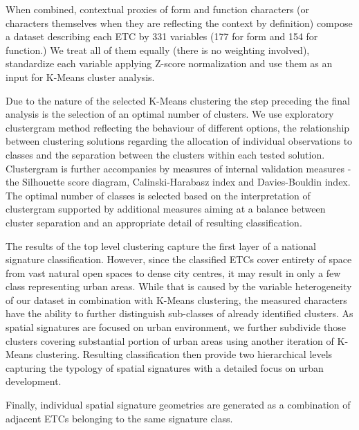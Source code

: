 

When combined, contextual proxies of form and function characters (or characters
themselves when they are reflecting the context by definition) compose a dataset
describing each ETC by 331 variables (177 for form and 154 for function.) We treat all
of them equally (there is no weighting involved), standardize each variable applying
Z-score normalization and use them as an input for K-Means cluster analysis.

Due to the nature of the selected K-Means clustering the step preceding the final
analysis is the selection of an optimal number of clusters. We use exploratory
clustergram method\cite{schonlau2002clustergram} reflecting the behaviour of different options, the relationship
between clustering solutions regarding the allocation of individual observations to
classes and the separation between the clusters within each tested solution.
Clustergram is further accompanies by measures of internal validation measures - the
Silhouette score diagram, Calinski-Harabasz index\cite{calinski1974} and Davies-Bouldin index\cite{davies1979cluster}. The optimal
number of classes is selected based on the interpretation of clustergram supported by
additional measures aiming at a balance between cluster separation and an appropriate
detail of resulting classification.

The results of the top level clustering capture the first layer of a national signature
classification. However, since the classified ETCs cover entirety of space from vast
natural open spaces to dense city centres, it may result in only a few class
representing urban areas. While that is caused by the variable heterogeneity of our
dataset in combination with K-Means clustering, the measured characters have the ability
to further distinguish sub-classes of already identified clusters. As spatial signatures
are focused on urban environment, we further subdivide those clusters covering
substantial portion of urban areas using another iteration of K-Means clustering.
Resulting classification then provide two hierarchical levels capturing the typology of
spatial signatures with a detailed focus on urban development.


Finally, individual spatial signature geometries are generated as a combination of
adjacent ETCs belonging to the same signature class.

